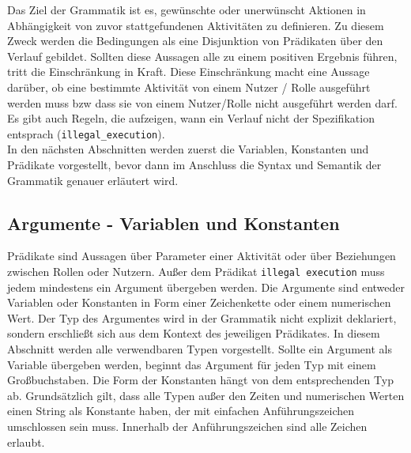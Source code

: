 Das Ziel der Grammatik ist es, gewünschte oder unerwünscht Aktionen in Abhängigkeit von zuvor stattgefundenen Aktivitäten zu definieren. Zu diesem Zweck werden die Bedingungen als eine Disjunktion von Prädikaten über den Verlauf gebildet. Sollten diese Aussagen alle zu einem positiven Ergebnis führen, tritt die Einschränkung in Kraft. Diese Einschränkung macht eine Aussage darüber, ob eine bestimmte Aktivität von einem Nutzer / Rolle ausgeführt werden muss bzw dass sie von einem Nutzer/Rolle nicht ausgeführt werden darf. Es gibt auch Regeln, die aufzeigen, wann ein Verlauf nicht der Spezifikation entsprach (\texttt{illegal\_execution}).\\
In den nächsten Abschnitten werden zuerst die Variablen, Konstanten und Prädikate vorgestellt, bevor dann im Anschluss die Syntax und Semantik der Grammatik genauer erläutert wird.

\subsection{Argumente - Variablen und Konstanten}

Prädikate sind Aussagen über Parameter einer Aktivität oder über Beziehungen zwischen Rollen oder Nutzern. Außer dem Prädikat \texttt{illegal execution} muss jedem mindestens ein Argument übergeben werden. Die Argumente sind entweder Variablen oder Konstanten in Form einer Zeichenkette oder einem numerischen Wert. Der Typ des Argumentes wird in der Grammatik nicht explizit deklariert, sondern erschließt sich aus dem Kontext des jeweiligen Prädikates. In diesem Abschnitt werden alle verwendbaren Typen vorgestellt. Sollte ein Argument als Variable übergeben werden, beginnt das Argument für jeden Typ mit einem Großbuchstaben. Die Form der Konstanten hängt von dem entsprechenden Typ ab. Grundsätzlich gilt, dass alle Typen außer den Zeiten und numerischen Werten einen String als Konstante haben, der mit einfachen Anführungszeichen umschlossen sein muss. Innerhalb der Anführungszeichen sind alle Zeichen erlaubt.

